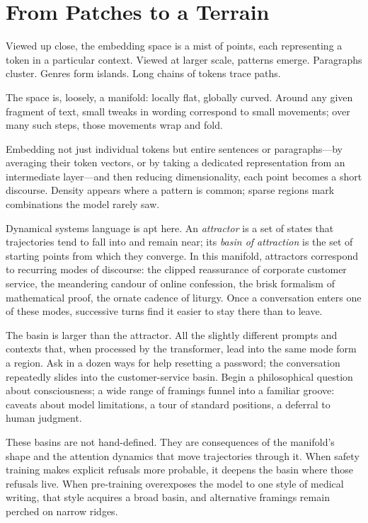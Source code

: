 \documentclass[12pt,a4paper]{article}
\begin{document}
\section{From Patches to a Terrain}

Viewed up close, the embedding space is a mist of points, each representing a token in a particular context. Viewed at larger scale, patterns emerge. Paragraphs cluster. Genres form islands. Long chains of tokens trace paths.

The space is, loosely, a manifold: locally flat, globally curved. Around any given fragment of text, small tweaks in wording correspond to small movements; over many such steps, those movements wrap and fold.

Embedding not just individual tokens but entire sentences or paragraphs---by averaging their token vectors, or by taking a dedicated representation from an intermediate layer---and then reducing dimensionality, each point becomes a short discourse. Density appears where a pattern is common; sparse regions mark combinations the model rarely saw.

Dynamical systems language is apt here. An \emph{attractor} is a set of states that trajectories tend to fall into and remain near; its \emph{basin of attraction} is the set of starting points from which they converge. In this manifold, attractors correspond to recurring modes of discourse: the clipped reassurance of corporate customer service, the meandering candour of online confession, the brisk formalism of mathematical proof, the ornate cadence of liturgy. Once a conversation enters one of these modes, successive turns find it easier to stay there than to leave.

The basin is larger than the attractor. All the slightly different prompts and contexts that, when processed by the transformer, lead into the same mode form a region. Ask in a dozen ways for help resetting a password; the conversation repeatedly slides into the customer-service basin. Begin a philosophical question about consciousness; a wide range of framings funnel into a familiar groove: caveats about model limitations, a tour of standard positions, a deferral to human judgment.

These basins are not hand-defined. They are consequences of the manifold's shape and the attention dynamics that move trajectories through it. When safety training makes explicit refusals more probable, it deepens the basin where those refusals live. When pre-training overexposes the model to one style of medical writing, that style acquires a broad basin, and alternative framings remain perched on narrow ridges.
\end{document}
